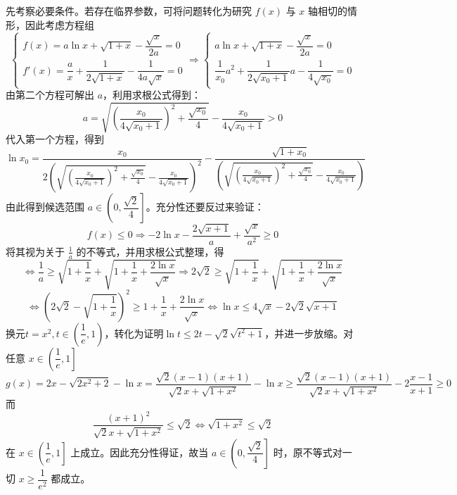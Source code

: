 \begin{solution}
    先考察必要条件。若存在临界参数，可将问题转化为研究 $f(x)$ 与 $x$ 轴相切的情形，因此考虑方程组
    \[\begin{cases}f(x)=a\ln x+\sqrt{1+x}-\dfrac{\sqrt{x}}{2a}=0\\[1.2ex]f'(x)=\dfrac{a}{x}+\dfrac{1}{2\sqrt{1+x}}-\dfrac{1}{4a\sqrt{x}}=0\end{cases}
    \Rightarrow \begin{cases}a\ln x+\sqrt{1+x}-\dfrac{\sqrt{x}}{2a}=0\\[1.2ex]\dfrac{1}{x_0}a^2+\dfrac{1}{2\sqrt{x_0+1}}a-\dfrac{1}{4\sqrt{x_0}}=0\end{cases}\]
    由第二个方程可解出 $a$，利用求根公式得到：
    \[a=\sqrt{\left(\frac{x_0}{4\sqrt{x_0+1}}\right)^2+\dfrac{\sqrt{x_0}}{4}}-\frac{x_0}{4\sqrt{x_0+1}}>0\]
    代入第一个方程，得到
    \[\ln x_0=\frac{x_0}{2\left(\sqrt{\left(\frac{x_0}{4\sqrt{x_0+1}}\right)^2+\frac{\sqrt{x_0}}{4}}-\frac{x_0}{4\sqrt{x_0+1}}\right)^2}-\dfrac{\sqrt{1+x_0}}{\left(\sqrt{\left(\frac{x_0}{4\sqrt{x_0+1}}\right)^2+\frac{\sqrt{x_0}}{4}}-\frac{x_0}{4\sqrt{x_0+1}}\right)}\]
    由此得到候选范围 $a\in\left(0,\dfrac{\sqrt{2}}{4}\right]$。充分性还要反过来验证：
    \[f(x)\leq0\Rightarrow-2\ln x-\frac{2\sqrt{x+1}}{a}+\frac{\sqrt{x}}{a^2}\geq0\]
    将其视为关于 \(\frac{1}{a}\) 的不等式，并用求根公式整理，得
    \[\Leftrightarrow \dfrac{1}{a}\geq\sqrt{1+\frac{1}{x}}+\sqrt{1+\frac{1}{x}+\frac{2\ln x}{\sqrt x}}\Rightarrow 2\sqrt2\geq\sqrt{1+\frac{1}{x}}+\sqrt{1+\frac{1}{x}+\frac{2\ln x}{\sqrt x}}\]
    \[\Leftrightarrow\left(2\sqrt{2}-\sqrt{1+\frac{1}{x}}\right)^{2}\geq1+\frac{1}{x}+\frac{2\ln x}{\sqrt{x}}\Leftrightarrow \ln x\leq4\sqrt{x}-2\sqrt{2}\sqrt{x+1}\]
    换元$t=x^2,t\in\left(\dfrac{1}{e},1\right)$，转化为证明$\ln t\leq 2t-\sqrt2\sqrt{t^2+1}$，并进一步放缩。对任意 $x\in\left(\dfrac{1}{e},1\right]$
    \[g(x)=2x-\sqrt{2x^2+2}-\ln x=\dfrac{\sqrt2(x-1)(x+1)}{\sqrt{2}x+\sqrt{1+x^2}}-\ln x\geq \dfrac{\sqrt2(x-1)(x+1)}{\sqrt{2}x+\sqrt{1+x^2}}-2\dfrac{x-1}{x+1}\geq 0\]
    而
    \[
    \dfrac{(x+1)^2}{\sqrt{2}x+\sqrt{1+x^2}}\leq \sqrt2
    \iff \sqrt{1+x^2}\leq \sqrt2
    \]
    在 $x\in\left(\dfrac1e,1\right]$ 上成立。因此充分性得证，故当 $a\in\left(0,\dfrac{\sqrt{2}}{4}\right]$ 时，原不等式对一切 $x\ge \dfrac{1}{e^2}$ 都成立。
\end{solution}
\newpage

